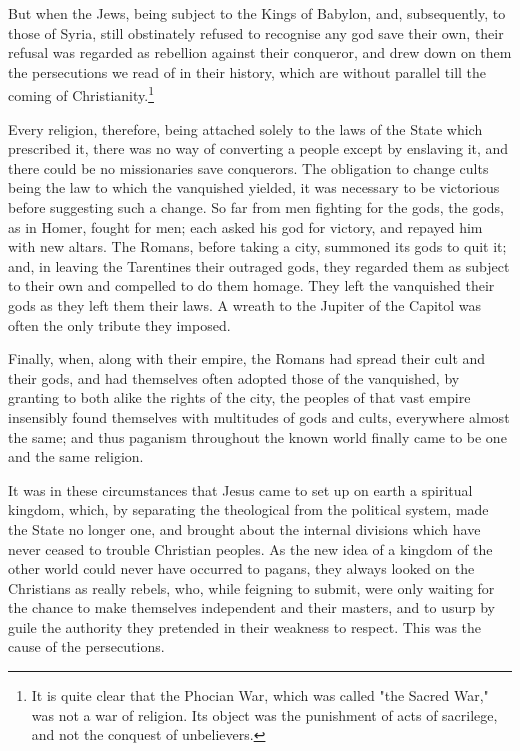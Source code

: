 \documentclass[12pt]{report}
\begin{document}
But when the Jews, being subject to the Kings of Babylon, and, subsequently, to those of Syria, still obstinately refused to recognise any god save their own, their refusal was regarded as rebellion against their conqueror, and drew down on them the persecutions we read of in their history, which are without parallel till the coming of Christianity.\footnote{It is quite clear that the Phocian War, which was called "the Sacred War," was not a war of religion. Its object was the punishment of acts of sacrilege, and not the conquest of unbelievers.}

Every religion, therefore, being attached solely to the laws of the State which prescribed it, there was no way of converting a people except by enslaving it, and there could be no missionaries save conquerors. The obligation to change cults being the law to which the vanquished yielded, it was necessary to be victorious before suggesting such a change. So far from men fighting for the gods, the gods, as in Homer, fought for men; each asked his god for victory, and repayed him with new altars. The Romans, before taking a city, summoned its gods to quit it; and, in leaving the Tarentines their outraged gods, they regarded them as subject to their own and compelled to do them homage. They left the vanquished their gods as they left them their laws. A wreath to the Jupiter of the Capitol was often the only tribute they imposed.

Finally, when, along with their empire, the Romans had spread their cult and their gods, and had themselves often adopted those of the vanquished, by granting to both alike the rights of the city, the peoples of that vast empire insensibly found themselves with multitudes of gods and cults, everywhere almost the same; and thus paganism throughout the known world finally came to be one and the same religion.

It was in these circumstances that Jesus came to set up on earth a spiritual kingdom, which, by separating the theological from the political system, made the State no longer one, and brought about the internal divisions which have never ceased to trouble Christian peoples. As the new idea of a kingdom of the other world could never have occurred to pagans, they always looked on the Christians as really rebels, who, while feigning to submit, were only waiting for the chance to make themselves independent and their masters, and to usurp by guile the authority they pretended in their weakness to respect. This was the cause of the persecutions.
\end{document}
